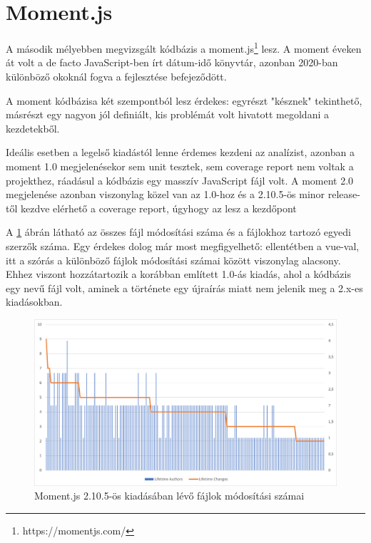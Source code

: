 \section{Moment.js}

A második mélyebben megvizsgált kódbázis a moment.js\footnote{https://momentjs.com/} lesz. A moment éveken át volt a de facto JavaScript-ben írt dátum-idő könyvtár, azonban 2020-ban különböző okoknál fogva a fejlesztése befejeződött.

A moment kódbázisa két szempontból lesz érdekes: egyrészt "késznek" tekinthető, másrészt egy nagyon jól definiált, kis problémát volt hivatott megoldani a kezdetekből.

Ideális esetben a legelső kiadástól lenne érdemes kezdeni az analízist, azonban a moment 1.0 megjelenésekor sem unit tesztek, sem coverage report nem voltak a projekthez, ráadásul a kódbázis egy masszív JavaScript fájl volt. A moment 2.0 megjelenése azonban viszonylag közel van az 1.0-hoz és a 2.10.5-ös minor release-től kezdve elérhető a coverage report, úgyhogy az lesz a kezdőpont

A \ref{fig:moment-2.10.5-changes} ábrán látható az összes fájl módosítási száma és a fájlokhoz tartozó egyedi szerzők száma. Egy érdekes dolog már most megfigyelhető: ellentétben a vue-val, itt a szórás a különböző fájlok módosítási számai között viszonylag alacsony. Ehhez viszont hozzátartozik a korábban említett 1.0-ás kiadás, ahol a kódbázis egy  nevű fájl volt, aminek a története egy újraírás miatt nem jelenik meg a 2.x-es kiadásokban. 

\begin{figure}[H]
    \centering
    \includegraphics[width=1\textwidth]{images/moment/moment-2.10.5-changes.png}
    \caption{Moment.js 2.10.5-ös kiadásában lévő fájlok módosítási számai}
    \label{fig:moment-2.10.5-changes}
\end{figure}

